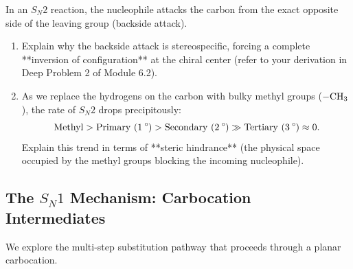 \documentclass[12pt, a4paper]{book}
\begin{document}
\begin{explobox}
In an $S_N2$ reaction, the nucleophile attacks the carbon from the exact opposite side of the leaving group (backside attack).
\begin{center}
\end{center}
\begin{enumerate}[label=(\alph*), leftmargin=*]
  \item Explain why the backside attack is stereospecific, forcing a complete **inversion of configuration** at the chiral center (refer to your derivation in Deep Problem 2 of Module 6.2).
  \item As we replace the hydrogens on the carbon with bulky methyl groups ($-\ce{CH3}$), the rate of $S_N2$ drops precipitously:
  \[
    \text{Methyl} > \text{Primary } (\ce{1^\circ}) > \text{Secondary } (\ce{2^\circ}) \gg \text{Tertiary } (\ce{3^\circ}) \approx 0.
  \]
  Explain this trend in terms of **steric hindrance** (the physical space occupied by the methyl groups blocking the incoming nucleophile).
\end{enumerate}
\end{explobox}

\subsection{The $S_N1$ Mechanism: Carbocation Intermediates}

We explore the multi-step substitution pathway that proceeds through a planar carbocation.
\end{document}
